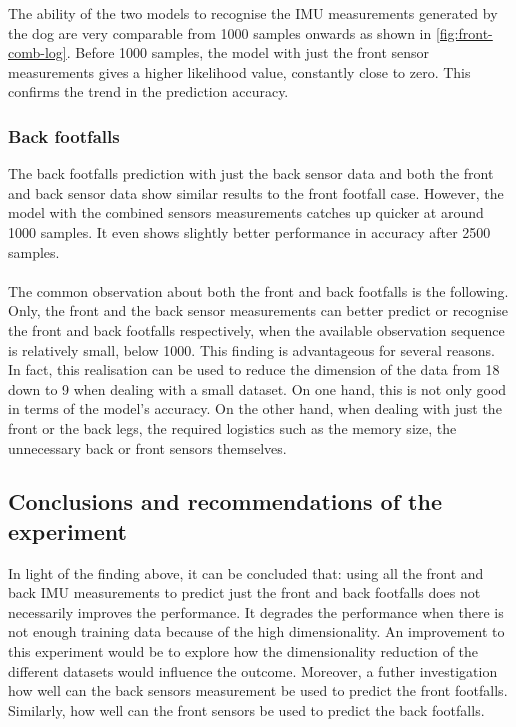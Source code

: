 The ability of the two models to recognise the IMU measurements generated by the dog are very comparable from 1000 samples onwards as shown in \ref{fig:front-comb-log}. Before 1000 samples, the model with just the front sensor measurements gives a higher likelihood value, constantly close to zero. This confirms the trend in the prediction accuracy.

\subsubsection{Back footfalls}

The back footfalls prediction with just the back sensor data and both the front and back sensor data show similar results to the front footfall case. However, the model with the combined sensors measurements catches up quicker at around 1000 samples. It even shows slightly better performance in accuracy after 2500 samples.\\\\
The common observation about both the front and back footfalls is the following. Only, the front and the back sensor measurements can better predict or recognise the front and back footfalls respectively, when the available observation sequence is relatively small, below 1000.
This finding is advantageous for several reasons. In fact, this realisation can be used to reduce the dimension of the data from 18 down to 9 when dealing with a small dataset. On one hand, this is not only good in terms of the model's accuracy. On the other hand, when dealing with just the front or the back legs, the required logistics such as the memory size, the unnecessary back or front sensors themselves. 

\subsection{Conclusions and recommendations of the experiment}
In light of the finding above, it can be concluded that: using all the front and back IMU measurements to predict just the front and back footfalls does not necessarily improves the performance. It degrades the performance when there is not enough training data because of the high dimensionality.
An improvement to this experiment would be to explore how the dimensionality reduction of the different datasets would influence the outcome. Moreover, a futher investigation how well can the back sensors measurement be used to predict the front footfalls. Similarly, how well can the front sensors be used to predict the back footfalls.



